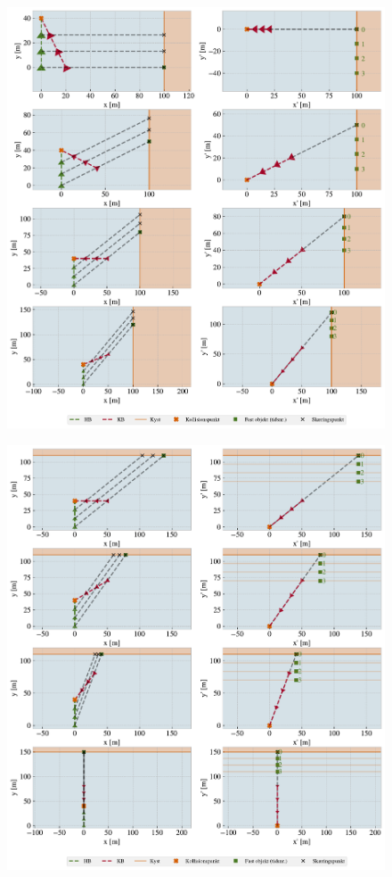 \documentclass[%
 reprint,
nofootinbib,
aps,
]{revtex4-1}
\begin{document}
\begin{figure}[H]
  \includegraphics[width=\linewidth]{figures/subplot_C1.pdf}
  \caption{}
  \label{}
\end{figure}


\begin{figure}[H]
  \includegraphics[width=\linewidth]{figures/subplot_C2.pdf}
  \caption{}
  \label{}
\end{figure}
\end{document}
